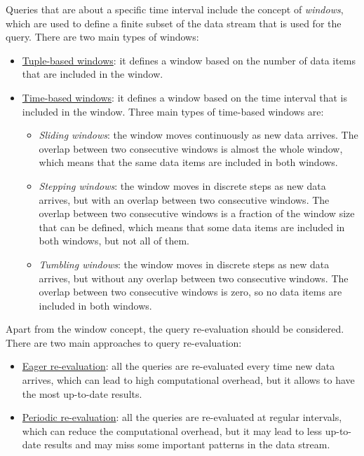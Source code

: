 Queries that are about a specific time interval include the concept of \emph{windows}, which are used to define a finite subset of the data stream that is used for the query. There are two main types of windows:
\begin{itemize}
    \item \ul{Tuple-based windows}: it defines a window based on the number of data items that are included in the window.
    \item \ul{Time-based windows}: it defines a window based on the time interval that is included in the window. Three main types of time-based windows are:
    \begin{itemize}
        \item \emph{Sliding windows}: the window moves continuously as new data arrives. The overlap between two consecutive windows is almost the whole window, which means that the same data items are included in both windows.
        \item \emph{Stepping windows}: the window moves in discrete steps as new data arrives, but with an overlap between two consecutive windows. The overlap between two consecutive windows is a fraction of the window size that can be defined, which means that some data items are included in both windows, but not all of them.
        \item \emph{Tumbling windows}: the window moves in discrete steps as new data arrives, but without any overlap between two consecutive windows. The overlap between two consecutive windows is zero, so no data items are included in both windows.
    \end{itemize}
\end{itemize}

Apart from the window concept, the query re-evaluation should be considered. There are two main approaches to query re-evaluation:
\begin{itemize}
    \item \ul{Eager re-evaluation}: all the queries are re-evaluated every time new data arrives, which can lead to high computational overhead, but it allows to have the most up-to-date results.
    \item \ul{Periodic re-evaluation}: all the queries are re-evaluated at regular intervals, which can reduce the computational overhead, but it may lead to less up-to-date results and may miss some important patterns in the data stream.
\end{itemize}

